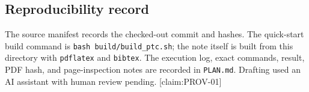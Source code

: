 \subsection{Reproducibility record}

The source manifest records the checked-out commit and hashes. The quick-start build command is \texttt{bash build/build\_ptc.sh}; the note itself is built from this directory with \texttt{pdflatex} and \texttt{bibtex}. The execution log, exact commands, result, PDF hash, and page-inspection notes are recorded in \texttt{PLAN.md}. Drafting used an AI assistant with human review pending. [claim:PROV-01]
